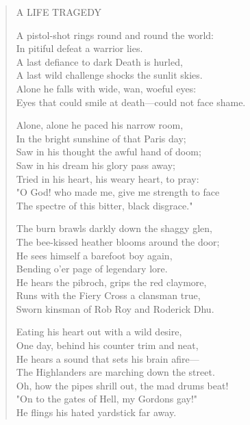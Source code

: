 \begin{verse}
 
A LIFE TRAGEDY

A pistol-shot rings round and round the world:\\
\hspace*{3em}In pitiful defeat a warrior lies.\\
A last defiance to dark Death is hurled,\\
\hspace*{3em}A last wild challenge shocks the sunlit skies.\\
\hspace*{3em}Alone he falls with wide, wan, woeful eyes:\\
Eyes that could smile at death—could not face shame.

Alone, alone he paced his narrow room,\\
\hspace*{3em}In the bright sunshine of that Paris day;\\
Saw in his thought the awful hand of doom;\\
\hspace*{3em}Saw in his dream his glory pass away;\\
\hspace*{3em}Tried in his heart, his weary heart, to pray:\\
"O God! who made me, give me strength to face\\
The spectre of this bitter, black disgrace."

The burn brawls darkly down the shaggy glen,\\
\hspace*{3em}The bee-kissed heather blooms around the door;\\
He sees himself a barefoot boy again,\\
\hspace*{3em}Bending o'er page of legendary lore.\\
\hspace*{3em}He hears the pibroch, grips the red claymore,\\
Runs with the Fiery Cross a clansman true,\\
Sworn kinsman of Rob Roy and Roderick Dhu.

Eating his heart out with a wild desire,\\
\hspace*{3em}One day, behind his counter trim and neat,\\
He hears a sound that sets his brain afire—\\
\hspace*{3em}The Highlanders are marching down the street.\\
\hspace*{3em}Oh, how the pipes shrill out, the mad drums beat!\\
"On to the gates of Hell, my Gordons gay!"\\
He flings his hated yardstick far away.


\end{verse}
